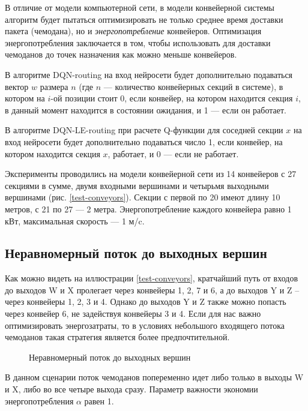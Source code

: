 \documentclass[specification,annotation,times]{itmo-student-thesis}
\theoremstyle{definition}
\begin{document}
В отличие от модели компьютерной сети, в модели конвейерной системы алгоритм
будет пытаться оптимизировать не только среднее время доставки пакета
(чемодана), но и \textit{энергопотребление} конвейеров. Оптимизация
энергопотребления заключается в том, чтобы использовать для доставки чемоданов
до точек назначения как можно меньше конвейеров.

В алгоритме DQN-routing на вход нейросети будет дополнительно подаваться вектор
$w$ размера $n$ (где $n$ --- количество конвейерных секций в системе), в котором на $i$-ой
позиции стоит 0, если конвейер, на котором находится секция $i$, в данный момент
находится в состоянии ожидания, и 1 --- если он работает.

В алгоритме DQN-LE-routing при расчете Q-функции для соседней секции $x$ на вход
нейросети будет дополнительно подаваться число 1, если конвейер, на котором
находится секция $x$, работает, и 0 --- если не работает.

Эксперименты проводились на модели конвейерной сети из 14 конвейеров с 27
секциями в сумме, двумя входными вершинами и четырьмя выходными вершинами (рис.
\ref{test-conveyors}). Секции с первой по 20 имеют длину 10 метров, с 21 по 27 --- 2
метра. Энергопотребление каждого конвейера равно 1 кВт, максимальная
скорость --- 1 м/c.

\subsection{Неравномерный поток до выходных вершин}

Как можно видеть на иллюстрации \ref{test-conveyors}, кратчайший путь от входов
до выходов W и X пролегает через конвейеры 1, 2, 7 и 6, а до выходов Y и Z --
через конвейеры 1, 2, 3 и 4. Однако до выходов Y и Z также можно попасть через
конвейер 6, не задействуя конвейеры 3 и 4. Если для нас важно оптимизировать
энергозатраты, то в условиях небольшого входящего потока чемоданов такая
стратегия является более предпочтительной.

\begin{figure}[!h]
  \centering
  \hfil
  \caption{Неравномерный поток до выходных вершин}\label{experiments:conveyors:1}
\end{figure}

В данном сценарии поток чемоданов попеременно идет либо только в выходы W и X,
либо во все четыре выхода сразу. Параметр важности экономии энергопотребления
$\alpha$ равен 1.
\end{document}
